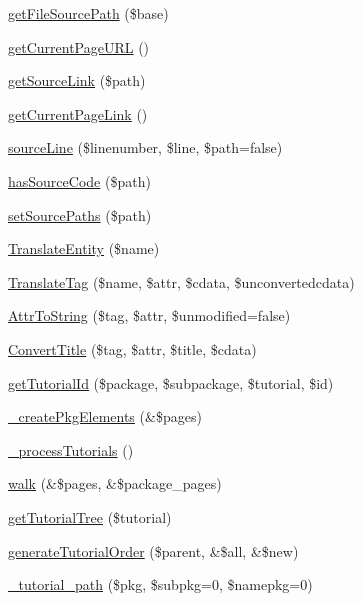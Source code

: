 \begin{DoxyCompactItemize}
\item 
\hyperlink{class_converter_ac6192819264eae4ff8aef75e72fa05f4}{get\-File\-Source\-Path} (\$base)
\item 
\hyperlink{class_converter_a23ce69a04a34e3e6a8fa0ec9e9dbb488}{get\-Current\-Page\-U\-R\-L} ()
\item 
\hyperlink{class_converter_a606ad911462a36f943313ed5475db5dc}{get\-Source\-Link} (\$path)
\item 
\hyperlink{class_converter_a37cda5b82aee3c5062d29b829345ef7e}{get\-Current\-Page\-Link} ()
\item 
\hyperlink{class_converter_a14f6bc6e9d8bbe09c506108e657b6f87}{source\-Line} (\$linenumber, \$line, \$path=false)
\item 
\hyperlink{class_converter_a5ad36d829edc65669f597e2e88037503}{has\-Source\-Code} (\$path)
\item 
\hyperlink{class_converter_a1a92ec3e7e0fe37a49d7b42d82d3c71a}{set\-Source\-Paths} (\$path)
\item 
\hyperlink{class_converter_a87b6cceda7f9eba0f61f27302908a156}{\-Translate\-Entity} (\$name)
\item 
\hyperlink{class_converter_ab9ab0247549341b08f5893f99c64b3c1}{\-Translate\-Tag} (\$name, \$attr, \$cdata, \$unconvertedcdata)
\item 
\hyperlink{class_converter_af09cf6cf0d490558843c8d376d20138f}{\-Attr\-To\-String} (\$tag, \$attr, \$unmodified=false)
\item 
\hyperlink{class_converter_a34f744b98dc148121f1622d65a4b6d25}{\-Convert\-Title} (\$tag, \$attr, \$title, \$cdata)
\item 
\hyperlink{class_converter_a98de4e6484c42e491de454411f606871}{get\-Tutorial\-Id} (\$package, \$subpackage, \$tutorial, \$id)
\item 
\hyperlink{class_converter_a8b2134f03d563c80a3fd65a93e6a24eb}{\-\_\-create\-Pkg\-Elements} (\&\$pages)
\item 
\hyperlink{class_converter_ac212031eea294ce3324288c550efd8c7}{\-\_\-process\-Tutorials} ()
\item 
\hyperlink{class_converter_a8266af4abd871087e8cba35324a77708}{walk} (\&\$pages, \&\$package\-\_\-pages)
\item 
\hyperlink{class_converter_a28567d2282b7667c51286051b78bbb5d}{get\-Tutorial\-Tree} (\$tutorial)
\item 
\hyperlink{class_converter_aa50355cfee419a35237d0be67d9ff9c5}{generate\-Tutorial\-Order} (\$parent, \&\$all, \&\$new)
\item 
\hyperlink{class_converter_a7a7b25bca0886115abb786cb87e58f5e}{\-\_\-tutorial\-\_\-path} (\$pkg, \$subpkg=0, \$namepkg=0)

\end{DoxyCompactItemize}
